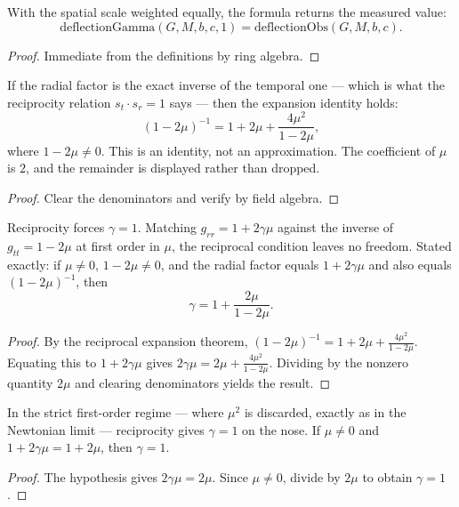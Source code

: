 \begin{theorem}
With the spatial scale weighted equally, the formula returns the measured value:
\[
\text{deflectionGamma}(G, M, b, c, 1) = \text{deflectionObs}(G, M, b, c).
\]
\begin{proof}
Immediate from the definitions by ring algebra.
\end{proof}
\end{theorem}

\begin{theorem}
If the radial factor is the exact inverse of the temporal one — which is what the reciprocity relation $s_t \cdot s_r = 1$ says — then the expansion identity holds:
\[
(1 - 2\mu)^{-1} = 1 + 2\mu + \frac{4\mu^2}{1 - 2\mu},
\]
where $1 - 2\mu \neq 0$. This is an identity, not an approximation. The coefficient of $\mu$ is $2$, and the remainder is displayed rather than dropped.
\begin{proof}
Clear the denominators and verify by field algebra.
\end{proof}
\end{theorem}

\begin{theorem}
Reciprocity forces $\gamma = 1$. Matching $g_{rr} = 1 + 2\gamma\mu$ against the inverse of $g_{tt} = 1 - 2\mu$ at first order in $\mu$, the reciprocal condition leaves no freedom. Stated exactly: if $\mu \neq 0$, $1 - 2\mu \neq 0$, and the radial factor equals $1 + 2\gamma\mu$ and also equals $(1-2\mu)^{-1}$, then
\[
\gamma = 1 + \frac{2\mu}{1 - 2\mu}.
\]
\begin{proof}
By the reciprocal expansion theorem, $(1-2\mu)^{-1} = 1 + 2\mu + \frac{4\mu^2}{1-2\mu}$. Equating this to $1 + 2\gamma\mu$ gives $2\gamma\mu = 2\mu + \frac{4\mu^2}{1-2\mu}$. Dividing by the nonzero quantity $2\mu$ and clearing denominators yields the result.
\end{proof}
\end{theorem}

\begin{theorem}
In the strict first-order regime — where $\mu^2$ is discarded, exactly as in the Newtonian limit — reciprocity gives $\gamma = 1$ on the nose. If $\mu \neq 0$ and $1 + 2\gamma\mu = 1 + 2\mu$, then $\gamma = 1$.
\begin{proof}
The hypothesis gives $2\gamma\mu = 2\mu$. Since $\mu \neq 0$, divide by $2\mu$ to obtain $\gamma = 1$.
\end{proof}
\end{theorem}

